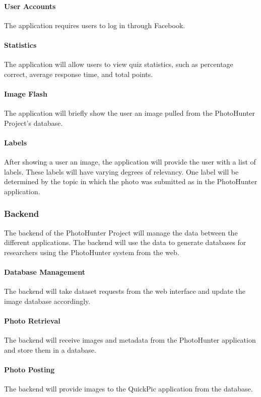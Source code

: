 \documentclass{article}
\begin{document}
  \paragraph{User Accounts}
  The application requires users to log in through Facebook.

  \paragraph{Statistics}
  The application will allow users to view quiz statistics, such as percentage
  correct, average response time, and total points.

  \paragraph{Image Flash}
  The application will briefly show the user an image pulled from the
  PhotoHunter Project's database.

  \paragraph{Labels}
  After showing a user an image, the application will provide the user with a
  list of labels. These labels will have varying degrees of relevancy. One label
  will be determined by the topic in which the photo was submitted as in the
  PhotoHunter application.

\subsubsection{Backend}
The backend of the PhotoHunter Project will manage the data between the different
applications. The backend will use the data to generate databases for researchers
using the PhotoHunter system from the web.

  \paragraph{Database Management}
  The backend will take dataset requests from the web interface and update the
  image database accordingly.

  \paragraph{Photo Retrieval}
  The backend will receive images and metadata from the PhotoHunter application
  and store them in a database.

  \paragraph{Photo Posting}
  The backend will provide images to the QuickPic application from the database.
\end{document}
